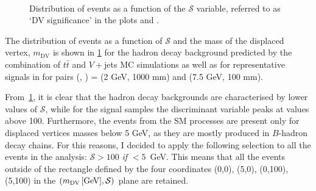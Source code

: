 \begin{figure}[!ht]
    \centering
    \\
    \caption{Distribution of events as a function of the $\mathcal{S}$ variable, referred to as `DV significance' in the plots and \mdv.}
    \label{fig:dvsigni_MDV}
\end{figure}

The distribution of events as a function of $\mathcal{S}$ and the mass of the displaced vertex, $m_{\text{DV}}$ is shown in \cref{fig:dvsigni_MDV} for the hadron decay background predicted by the combination of $t\bar{t}$ and $V+$jets MC simulations as well as for representative signals in for pairs (\mhnl, \ctau) = (2 GeV, 1000 mm) and (7.5 GeV, 100 mm).

From~\cref{fig:dvsigni_MDV}, it is clear that the hadron decay backgrounds are characterised by lower values of $\mathcal{S}$, while for the signal samples the discriminant variable peaks at values above 100. Furthermore, the events from the SM processes are present only for displaced vertices masses below 5 GeV, as they are mostly produced in $B$-hadron decay chains. For this reasons, I decided to apply the following selection to all the events in the analysis: $\mathcal{S}>100$ \textit{if} \mdv$<5$~GeV. This means that all the events outside of the rectangle defined by the four coordinates (0,0), (5,0), (0,100), (5,100) in the $(m_{\mathrm{DV}}\,[\text{GeV}],\mathcal{S})$ plane are retained.

